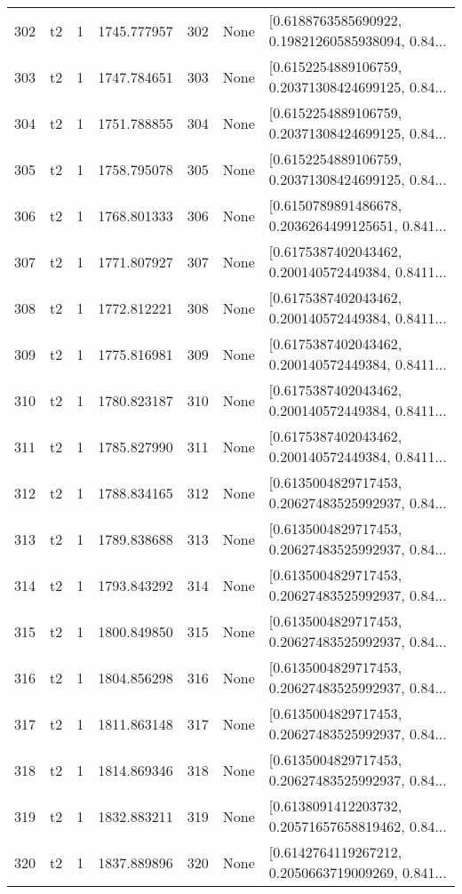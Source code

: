 \begin{tabular}{lllrlll}
302 &  t2 &   1 &  1745.777957 &  302 &  None &  [0.6188763585690922, 0.19821260585938094, 0.84... \\
303 &  t2 &   1 &  1747.784651 &  303 &  None &  [0.6152254889106759, 0.20371308424699125, 0.84... \\
304 &  t2 &   1 &  1751.788855 &  304 &  None &  [0.6152254889106759, 0.20371308424699125, 0.84... \\
305 &  t2 &   1 &  1758.795078 &  305 &  None &  [0.6152254889106759, 0.20371308424699125, 0.84... \\
306 &  t2 &   1 &  1768.801333 &  306 &  None &  [0.6150789891486678, 0.2036264499125651, 0.841... \\
307 &  t2 &   1 &  1771.807927 &  307 &  None &  [0.6175387402043462, 0.200140572449384, 0.8411... \\
308 &  t2 &   1 &  1772.812221 &  308 &  None &  [0.6175387402043462, 0.200140572449384, 0.8411... \\
309 &  t2 &   1 &  1775.816981 &  309 &  None &  [0.6175387402043462, 0.200140572449384, 0.8411... \\
310 &  t2 &   1 &  1780.823187 &  310 &  None &  [0.6175387402043462, 0.200140572449384, 0.8411... \\
311 &  t2 &   1 &  1785.827990 &  311 &  None &  [0.6175387402043462, 0.200140572449384, 0.8411... \\
312 &  t2 &   1 &  1788.834165 &  312 &  None &  [0.6135004829717453, 0.20627483525992937, 0.84... \\
313 &  t2 &   1 &  1789.838688 &  313 &  None &  [0.6135004829717453, 0.20627483525992937, 0.84... \\
314 &  t2 &   1 &  1793.843292 &  314 &  None &  [0.6135004829717453, 0.20627483525992937, 0.84... \\
315 &  t2 &   1 &  1800.849850 &  315 &  None &  [0.6135004829717453, 0.20627483525992937, 0.84... \\
316 &  t2 &   1 &  1804.856298 &  316 &  None &  [0.6135004829717453, 0.20627483525992937, 0.84... \\
317 &  t2 &   1 &  1811.863148 &  317 &  None &  [0.6135004829717453, 0.20627483525992937, 0.84... \\
318 &  t2 &   1 &  1814.869346 &  318 &  None &  [0.6135004829717453, 0.20627483525992937, 0.84... \\
319 &  t2 &   1 &  1832.883211 &  319 &  None &  [0.6138091412203732, 0.20571657658819462, 0.84... \\
320 &  t2 &   1 &  1837.889896 &  320 &  None &  [0.6142764119267212, 0.2050663719009269, 0.841... \\

\end{tabular}
